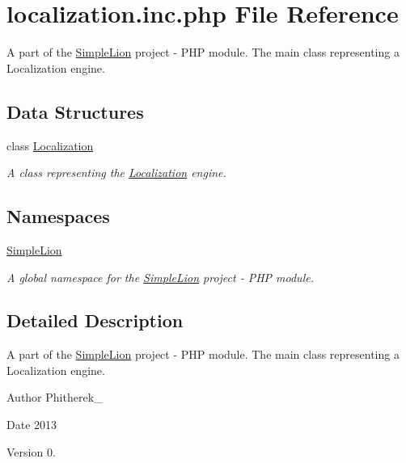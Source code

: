 \hypertarget{localization_8inc_8php}{\section{localization.\-inc.\-php File Reference}
\label{localization_8inc_8php}
}


A part of the \hyperlink{namespace_simple_lion}{Simple\-Lion} project -\/ P\-H\-P module. The main class representing a Localization engine.  


\subsection*{Data Structures}
\begin{DoxyCompactItemize}
\item 
class \hyperlink{class_simple_lion_1_1_localization}{Localization}
\begin{DoxyCompactList}\small\item\em A class representing the \hyperlink{class_simple_lion_1_1_localization}{Localization} engine. \end{DoxyCompactList}\end{DoxyCompactItemize}
\subsection*{Namespaces}
\begin{DoxyCompactItemize}
\item 
\hyperlink{namespace_simple_lion}{Simple\-Lion}
\begin{DoxyCompactList}\small\item\em A global namespace for the \hyperlink{namespace_simple_lion}{Simple\-Lion} project -\/ P\-H\-P module. \end{DoxyCompactList}\end{DoxyCompactItemize}


\subsection{Detailed Description}
A part of the \hyperlink{namespace_simple_lion}{Simple\-Lion} project -\/ P\-H\-P module. The main class representing a Localization engine. \begin{DoxyAuthor}{Author}
Phitherek\-\_\- 
\end{DoxyAuthor}
\begin{DoxyDate}{Date}
2013 
\end{DoxyDate}
\begin{DoxyVersion}{Version}
0. 
\end{DoxyVersion}
